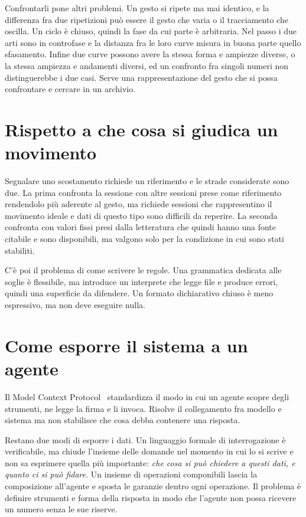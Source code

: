 Confrontarli pone altri problemi. Un gesto si ripete ma mai identico, e la
differenza fra due ripetizioni può essere il gesto che varia o il tracciamento
che oscilla. Un ciclo è chiuso, quindi la fase da cui parte è arbitraria. Nel
passo i due arti sono in controfase e la distanza fra le loro curve misura in
buona parte quello sfasamento. Infine due curve possono avere la stessa forma e
ampiezze diverse, o la stessa ampiezza e andamenti diversi, ed un confronto fra
singoli numeri non distinguerebbe i due casi. Serve una rappresentazione del gesto
che si possa confrontare e cercare in un archivio.

\section{Rispetto a che cosa si giudica un movimento}
\label{sec:ch2:alert}

Segnalare uno scostamento richiede un riferimento e le strade considerate sono
due. La prima confronta la sessione con altre sessioni prese come riferimento rendendolo 
più aderente al gesto, ma richiede sessioni che rappresentino il movimento
ideale e dati di questo tipo sono difficili da reperire. La seconda confronta
con valori fissi presi dalla letteratura che quindi hanno una fonte citabile e sono
disponibili, ma valgono solo per la condizione in cui sono stati stabiliti.

C'è poi il problema di come scrivere le regole. Una grammatica dedicata alle
soglie è flessibile, ma introduce un interprete che legge file e produce errori,
 quindi una superficie da difendere. Un formato dichiarativo chiuso è meno
espressivo, ma non deve eseguire nulla.

\section{Come esporre il sistema a un agente}
\label{sec:ch2:mcp}

Il Model Context Protocol~\cite{mcpspec} standardizza il modo in cui un agente
scopre degli strumenti, ne legge la firma e li invoca. Risolve il collegamento fra
modello e sistema ma non stabilisce che cosa debba contenere una risposta.

Restano due modi di esporre i dati. Un linguaggio formale di interrogazione è
verificabile, ma chiude l'insieme delle domande nel momento in cui lo si scrive e
non sa esprimere quella più importante: \emph{che cosa si può chiedere a questi
dati, e quanto ci si può fidare}. Un insieme di operazioni componibili lascia la
composizione all'agente e sposta le garanzie dentro ogni operazione. Il problema
è definire strumenti e forma della risposta in modo che l'agente non possa
ricevere un numero senza le sue riserve.

